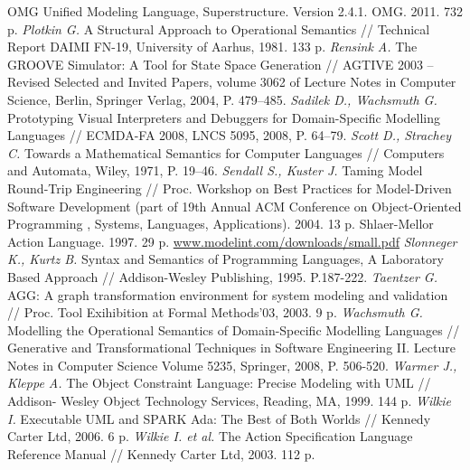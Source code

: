 \documentclass[a5paper]{article}
\begin{document}
\begin{thebibliography}{9001}
 OMG Unified Modeling Language, Superstructure. Version 2.4.1. OMG. 2011. 732 p.
 \emph{Plotkin G.} A Structural Approach to Operational Semantics // Technical Report DAIMI FN-19, University of Aarhus, 1981. 133 p.
 \emph{Rensink A.} The GROOVE Simulator: A Tool for State Space Generation // AGTIVE 2003 – Revised   Selected and Invited Papers, volume 3062 of Lecture Notes in Computer Science, Berlin, Springer Verlag, 2004, P. 479–485.
 \emph{Sadilek D., Wachsmuth G.} Prototyping Visual Interpreters and Debuggers for Domain-Specific Modelling Languages // ECMDA-FA 2008, LNCS 5095, 2008, P. 64–79.
 \emph{Scott D., Strachey C.} Towards a Mathematical Semantics for Computer Languages // Computers and Automata, Wiley, 1971, P. 19–46.
 \emph{Sendall S., Kuster J.} Taming Model Round-Trip Engineering // Proc. Workshop on Best Practices for Model-Driven Software Development (part of 19th Annual ACM Conference on Object-Oriented Programming , Systems, Languages, Applications). 2004. 13 p.
 Shlaer-Mellor Action Language. 1997. 29 p. \url{www.modelint.com/downloads/small.pdf}
 \emph{Slonneger K., Kurtz B.} Syntax and Semantics of Programming Languages, A Laboratory Based Approach // Addison-Wesley Publishing, 1995. P.187-222.
 \emph{Taentzer G.} AGG: A graph transformation environment for system modeling and validation // Proc. Tool Exihibition at Formal Methods’03, 2003. 9 p.
 \emph{Wachsmuth G.} Modelling the Operational Semantics of Domain-Specific Modelling Languages // Generative and Transformational Techniques in Software Engineering II. Lecture Notes in Computer Science Volume 5235, Springer, 2008, P. 506-520.
 \emph{Warmer J., Kleppe A.} The Object Constraint Language: Precise Modeling with UML // Addison- Wesley Object Technology Services, Reading, MA, 1999. 144 p.
 \emph{Wilkie I.} Executable UML and SPARK Ada: The Best of Both Worlds // Kennedy Carter Ltd, 2006. 6 p.
 \emph{Wilkie I. et al.} The Action Specification Language Reference Manual // Kennedy Carter Ltd, 2003. 112 p.
\end{thebibliography}
\end{document}
